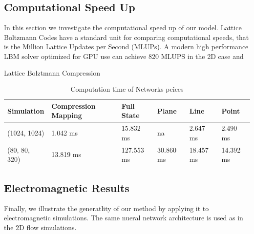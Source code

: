 \documentclass{article}
\begin{document}
\subsection{Computational Speed Up}

In this section we investigate the computational speed up of our model. Lattice Boltzmann Codes have a standard unit for comparing computational speeds, that is the Million Lattice Updates per Second (MLUPs). A modern high performance LBM solver optimized for GPU use can achieve 820 MLUPS in the 2D case and 

Lattice Bolztmann Compression

\begin{table}[]
\caption{Computation time of Networks peices} \label{compute_times}
\centering
\begin{tabular}{|l|lllll|}
\hline
Simulation    & Compression Mapping & Full State  & Plane      & Line       & Point   \\ \hline
(1024, 1024)  & 1.042 ms            & 15.832 ms   & na         & 2.647 ms   & 2.490 ms \\ 
(80, 80, 320) & 13.819 ms           & 127.553 ms  & 30.860 ms  & 18.457 ms  & 14.392 ms \\ 
\hline
\end{tabular}
\end{table}

\subsection{Electromagnetic Results}

Finally, we illustrate the generatlity of our method by applying it to electromagnetic simulations. The same nueral network architecture is used as in the 2D flow simulations. 
\end{document}
